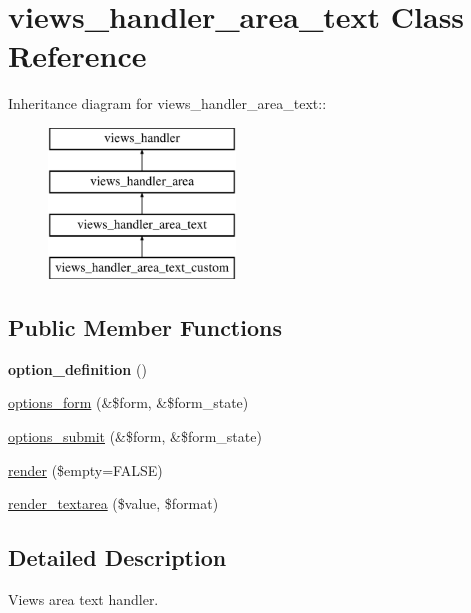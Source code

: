 \hypertarget{classviews__handler__area__text}{
\section{views\_\-handler\_\-area\_\-text Class Reference}
\label{classviews__handler__area__text}
}
Inheritance diagram for views\_\-handler\_\-area\_\-text::\begin{figure}[H]
\begin{center}
\leavevmode
\includegraphics[height=4cm]{classviews__handler__area__text}
\end{center}
\end{figure}
\subsection*{Public Member Functions}
\begin{DoxyCompactItemize}
\item 
\hypertarget{classviews__handler__area__text_aaf8be6ace08880fdc6a37039b833c6bd}{
{\bfseries option\_\-definition} ()}
\label{classviews__handler__area__text_aaf8be6ace08880fdc6a37039b833c6bd}

\item 
\hyperlink{classviews__handler__area__text_a2781ce4797304f2ce2a026820e0006fb}{options\_\-form} (\&\$form, \&\$form\_\-state)
\item 
\hyperlink{classviews__handler__area__text_a337ccf78771d5b61ba7ded71532f9b48}{options\_\-submit} (\&\$form, \&\$form\_\-state)
\item 
\hyperlink{classviews__handler__area__text_a61ad1d6b876311e1d09576230654a794}{render} (\$empty=FALSE)
\item 
\hyperlink{classviews__handler__area__text_a49adb1db6c56bf8f5ec74ed6015c739e}{render\_\-textarea} (\$value, \$format)
\end{DoxyCompactItemize}


\subsection{Detailed Description}
Views area text handler. 

